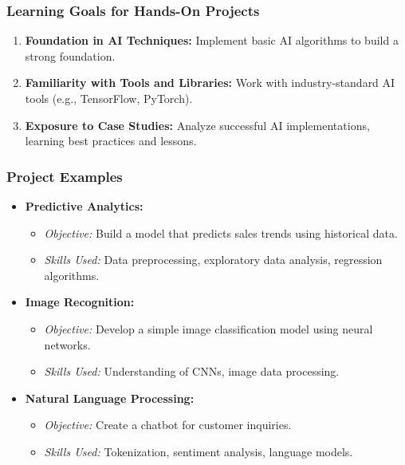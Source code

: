 \documentclass[aspectratio=169]{beamer}
\begin{document}
\begin{frame}[fragile]
    \frametitle{Learning Goals for Hands-On Projects}
    \begin{enumerate}
        \item \textbf{Foundation in AI Techniques:} Implement basic AI algorithms to build a strong foundation.
        \item \textbf{Familiarity with Tools and Libraries:} Work with industry-standard AI tools (e.g., TensorFlow, PyTorch).
        \item \textbf{Exposure to Case Studies:} Analyze successful AI implementations, learning best practices and lessons.
    \end{enumerate}
\end{frame}

\begin{frame}[fragile]
    \frametitle{Project Examples}
    \begin{itemize}
        \item \textbf{Predictive Analytics:}
        \begin{itemize}
            \item \textit{Objective:} Build a model that predicts sales trends using historical data.
            \item \textit{Skills Used:} Data preprocessing, exploratory data analysis, regression algorithms.
        \end{itemize}
        
        \item \textbf{Image Recognition:}
        \begin{itemize}
            \item \textit{Objective:} Develop a simple image classification model using neural networks.
            \item \textit{Skills Used:} Understanding of CNNs, image data processing.
        \end{itemize}
        
        \item \textbf{Natural Language Processing:}
        \begin{itemize}
            \item \textit{Objective:} Create a chatbot for customer inquiries.
            \item \textit{Skills Used:} Tokenization, sentiment analysis, language models.
        \end{itemize}
    \end{itemize}
\end{frame}
\end{document}
